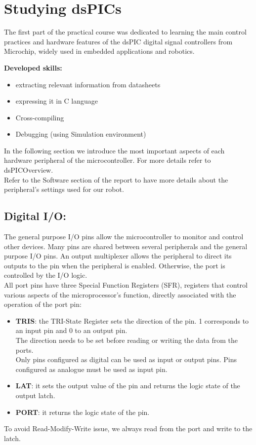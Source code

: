 \section{Studying dsPICs}

The first part of the practical course was dedicated to learning the main control practices and hardware features of the dsPIC digital signal controllers from Microchip, widely used in embedded applications and robotics.

\textbf{Developed skills:}
\begin{itemize}
    \item extracting relevant information from datasheets
    \item expressing it in C language
    \item Cross-compiling
    \item Debugging (using Simulation environment)
\end{itemize}

In the following section we introduce the most important aspects of each hardware peripheral of the microcontroller. For more details refer to dsPICOverview.\\
Refer to the Software section of the report to have more details about the peripheral’s settings used for our robot.

\subsection{Digital I/O:}

The general purpose I/O pins allow the microcontroller to monitor and control other devices.
Many pins are shared between several peripherals and the general purpose I/O pins.  An output multiplexer allows the peripheral to direct its outputs to the pin when the peripheral is enabled. Otherwise, the port is controlled by the I/O logic.\\
All port pins have three Special Function Registers (SFR), registers that control various aspects of the microprocessor's function, directly associated with the operation of the port pin:
\begin{itemize}
    \item \textbf{TRIS}: the TRI-State Register sets the direction of the pin. 1 corresponds to an input pin and 0 to an output pin.\\
    The direction needs to be set before reading or writing the data from the ports. \\
    Only pins configured as digital can be used as input or output pins. Pins configured as analogue must be used as input pin.
    \item \textbf{LAT}: it sets the output value of the pin and returns the logic state of the output latch.
    \item \textbf{PORT}: it returns the logic state of the pin. 
\end{itemize}
To avoid Read-Modify-Write issue, we always read from the port and write to the latch.

